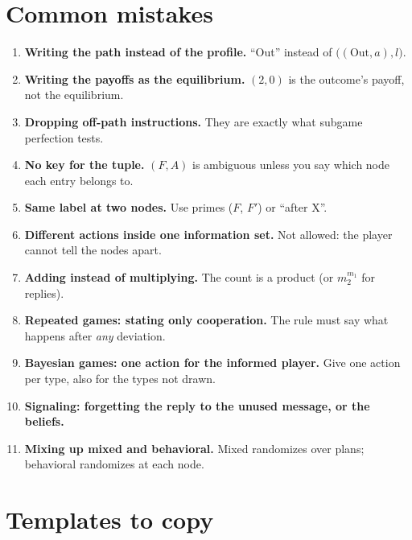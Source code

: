 \documentclass[11pt,a4paper]{article}
\begin{document}
\section{Common mistakes}

\begin{enumerate}
\item \textbf{Writing the path instead of the profile.} ``Out'' instead of $\big((\text{Out},a),l\big)$.
\item \textbf{Writing the payoffs as the equilibrium.} $(2,0)$ is the outcome's payoff, not the
equilibrium.
\item \textbf{Dropping off-path instructions.} They are exactly what subgame perfection tests.
\item \textbf{No key for the tuple.} $(F,A)$ is ambiguous unless you say which node each entry
belongs to.
\item \textbf{Same label at two nodes.} Use primes ($F$, $F'$) or ``after X''.
\item \textbf{Different actions inside one information set.} Not allowed: the player cannot tell
the nodes apart.
\item \textbf{Adding instead of multiplying.} The count is a product (or $m_2^{m_1}$ for replies).
\item \textbf{Repeated games: stating only cooperation.} The rule must say what happens after
\emph{any} deviation.
\item \textbf{Bayesian games: one action for the informed player.} Give one action per type, also
for the types not drawn.
\item \textbf{Signaling: forgetting the reply to the unused message, or the beliefs.}
\item \textbf{Mixing up mixed and behavioral.} Mixed randomizes over plans; behavioral randomizes
at each node.
\end{enumerate}

\section{Templates to copy}
\end{document}
